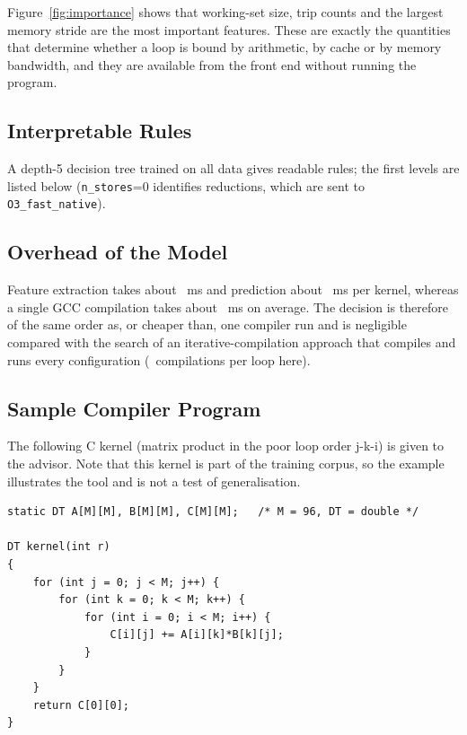 

Figure~\ref{fig:importance} shows that working-set size, trip counts and the largest memory stride
are the most important features. These are exactly the quantities that determine whether a loop is
bound by arithmetic, by cache or by memory bandwidth, and they are available from the
front end without running the program.

\subsection{Interpretable Rules}

A depth-5 decision tree trained on all data gives readable rules; the first levels are listed below
(\texttt{n\_stores}=0 identifies reductions, which are sent to \texttt{O3\_fast\_native}).



\subsection{Overhead of the Model}

Feature extraction takes about \featMs\ ms and prediction about \predMs\ ms per kernel, whereas a
single GCC compilation takes about \gccCompileMs\ ms on average. The decision is therefore of the same
order as, or cheaper than, one compiler run and is negligible compared with the search of an
iterative-compilation approach that compiles and runs every configuration (\numConfigs\ compilations per loop here).

\subsection{Sample Compiler Program}

The following C kernel (matrix product in the poor loop order j-k-i) is given to the advisor.
Note that this kernel is part of the training corpus, so the example illustrates the
tool and is not a test of generalisation.

\begin{lstlisting}
static DT A[M][M], B[M][M], C[M][M];   /* M = 96, DT = double */

DT kernel(int r)
{
    for (int j = 0; j < M; j++) {
        for (int k = 0; k < M; k++) {
            for (int i = 0; i < M; i++) {
                C[i][j] += A[i][k]*B[k][j];
            }
        }
    }
    return C[0][0];
}
\end{lstlisting}

